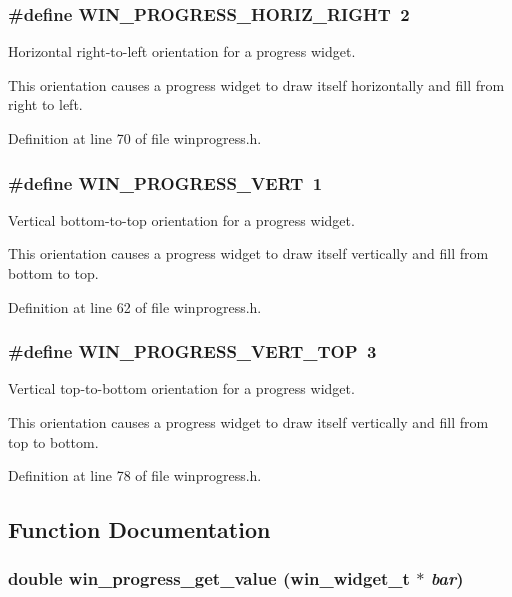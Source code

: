 \subsubsection{\setlength{\rightskip}{0pt plus 5cm}\#define WIN\_\-PROGRESS\_\-HORIZ\_\-RIGHT~2}\label{winprogress_8h_a2}


Horizontal right-to-left orientation for a progress widget. 

This orientation causes a progress widget to draw itself horizontally and fill from right to left. 

Definition at line 70 of file winprogress.h.
\subsubsection{\setlength{\rightskip}{0pt plus 5cm}\#define WIN\_\-PROGRESS\_\-VERT~1}\label{winprogress_8h_a1}


Vertical bottom-to-top orientation for a progress widget. 

This orientation causes a progress widget to draw itself vertically and fill from bottom to top. 

Definition at line 62 of file winprogress.h.
\subsubsection{\setlength{\rightskip}{0pt plus 5cm}\#define WIN\_\-PROGRESS\_\-VERT\_\-TOP~3}\label{winprogress_8h_a3}


Vertical top-to-bottom orientation for a progress widget. 

This orientation causes a progress widget to draw itself vertically and fill from top to bottom. 

Definition at line 78 of file winprogress.h.

\subsection{Function Documentation}
\subsubsection{\setlength{\rightskip}{0pt plus 5cm}double win\_\-progress\_\-get\_\-value ({\bf win\_\-widget\_\-t} $\ast$ {\em bar})}\label{winprogress_8h_a6}


